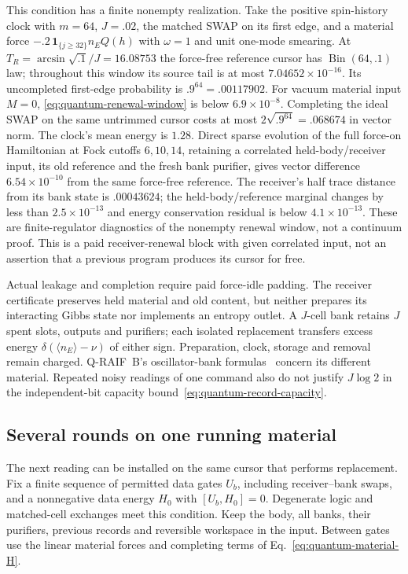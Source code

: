 This condition has a finite nonempty realization.
Take the positive spin-history clock with $m=64$, $J=.02$,
the matched SWAP on its first edge, and a material force
$-.2\,\mathbf1_{\{j\ge32\}}n_EQ(h)$ with $\omega=1$ and unit
one-mode smearing. At $T_R=\arcsin\sqrt{.1}/J=16.08753$ the
force-free reference cursor has $\operatorname{Bin}(64,.1)$ law;
throughout this window its source tail is at most
$7.04652\times10^{-16}$.
Its uncompleted first-edge probability is $.9^{64}=.00117902$.
For vacuum material input $M=0$,
\eqref{eq:quantum-renewal-window} is below $6.9\times10^{-8}$.
Completing the ideal SWAP on the same untrimmed cursor costs at most
$2\sqrt{.9^{64}}=.068674$ in vector norm.
The clock's mean energy is $1.28$.
Direct sparse evolution of the full force-on Hamiltonian at Fock
cutoffs $6,10,14$, retaining a correlated held-body/receiver input,
its old reference and the fresh bank purifier, gives vector difference
$6.54\times10^{-10}$ from the same force-free reference.
The receiver's half trace distance from its bank state is $.00043624$;
the held-body/reference marginal changes by less than
$2.5\times10^{-13}$ and energy conservation residual is below
$4.1\times10^{-13}$. These are finite-regulator diagnostics of the
nonempty renewal window, not a continuum proof.
This is a paid receiver-renewal block with given correlated input,
not an assertion that a previous program produces its cursor for free.

Actual leakage and completion require paid force-idle padding. The
receiver certificate preserves held material and old content, but
neither prepares its interacting Gibbs state nor implements an entropy
outlet. A $J$-cell bank retains $J$ spent slots, outputs and purifiers;
each isolated replacement transfers excess energy
$\delta(\langle n_E\rangle-\nu)$ of either sign. Preparation,
clock, storage and removal remain charged. Q-RAIF~B's oscillator-bank
formulas~\cite{Liu2026QRAIF_B} concern its different material. Repeated
noisy readings of one command also do not justify $J\log2$ in the
independent-bit capacity bound~\eqref{eq:quantum-record-capacity}.

\subsection{Several rounds on one running material}
\label{sec:one-path-rounds}

The next reading can be installed on the same cursor that performs
replacement. Fix a finite sequence of permitted data gates $U_b$,
including receiver--bank swaps, and a nonnegative data energy $H_0$
with $[U_b,H_0]=0$. Degenerate logic and matched-cell exchanges meet
this condition. Keep the body, all banks, their purifiers, previous
records and reversible workspace in the input. Between gates use
the linear material forces and completing terms of
Eq.~\eqref{eq:quantum-material-H}.

